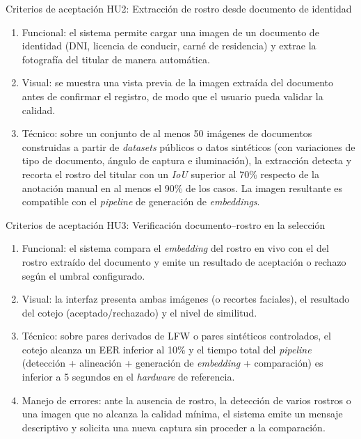 \documentclass[
  11pt, %
]{charter}
\begin{document}
Criterios de aceptación HU2: Extracción de rostro desde documento de identidad
\begin{enumerate}
  \item Funcional: el sistema permite cargar una imagen de un documento de identidad (DNI, licencia de conducir, carné de residencia) y extrae la fotografía del titular de manera automática.
  \item Visual: se muestra una vista previa de la imagen extraída del documento antes de confirmar el registro, de modo que el usuario pueda validar la calidad.
  \item Técnico: sobre un conjunto de al menos 50 imágenes de documentos construidas a partir de \textit{datasets} públicos o datos sintéticos (con variaciones de tipo de documento, ángulo de captura e iluminación), la extracción detecta y recorta el rostro del titular con un \textit{IoU} superior al 70\% respecto de la anotación manual en al menos el 90\% de los casos. La imagen resultante es compatible con el \textit{pipeline} de generación de \textit{embeddings}.
\end{enumerate}

Criterios de aceptación HU3: Verificación documento--rostro en la selección
\begin{enumerate}
  \item Funcional: el sistema compara el \textit{embedding} del rostro en vivo con el del rostro extraído del documento y emite un resultado de aceptación o rechazo según el umbral configurado.
  \item Visual: la interfaz presenta ambas imágenes (o recortes faciales), el resultado del cotejo (aceptado/rechazado) y el nivel de similitud.
  \item Técnico: sobre pares derivados de LFW o pares sintéticos controlados, el cotejo alcanza un EER inferior al 10\% y el tiempo total del \textit{pipeline} (detección + alineación + generación de \textit{embedding} + comparación) es inferior a 5 segundos en el \textit{hardware} de referencia.
  \item Manejo de errores: ante la ausencia de rostro, la detección de varios rostros o una imagen que no alcanza la calidad mínima, el sistema emite un mensaje descriptivo y solicita una nueva captura sin proceder a la comparación.
\end{enumerate}
\end{document}
